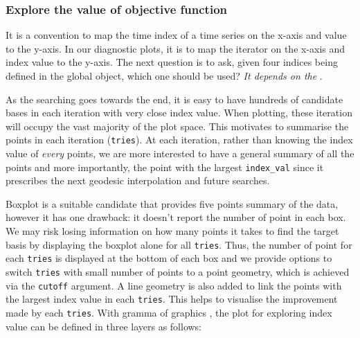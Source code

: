 \documentclass[12pt]{article}
\begin{document}
\hypertarget{static}{%
\subsubsection{Explore the value of objective function}\label{static}}

It is a convention to map the time index of a time series on the x-axis
and value to the y-axis. In our diagnostic plots, it is to map the
iterator on the x-axis and index value to the y-axis. The next question
is to ask, given four indices being defined in the global object, which
one should be used? \emph{It depends on the }.

As the searching goes towards the end, it is easy to have hundreds of
candidate bases in each iteration with very close index value. When
plotting, these iteration will occupy the vast majority of the plot
space. This motivates to summarise the points in each iteration
(\texttt{tries}). At each iteration, rather than knowing the index value
of \emph{every} points, we are more interested to have a general summary
of all the points and more importantly, the point with the largest
\texttt{index\_val} since it prescribes the next geodesic interpolation
and future searches.

Boxplot is a suitable candidate that provides five points summary of the
data, however it has one drawback: it doesn't report the number of point
in each box. We may risk losing information on how many points it takes
to find the target basis by displaying the boxplot alone for all
\texttt{tries}. Thus, the number of point for each \texttt{tries} is
displayed at the bottom of each box and we provide options to switch
\texttt{tries} with small number of points to a point geometry, which is
achieved via the \texttt{cutoff} argument. A line geometry is also added
to link the points with the largest index value in each \texttt{tries}.
This helps to visualise the improvement made by each \texttt{tries}.
With gramma of graphics \citep{wickham2010layered}, the plot for
exploring index value can be defined in three layers as follows:
\end{document}

